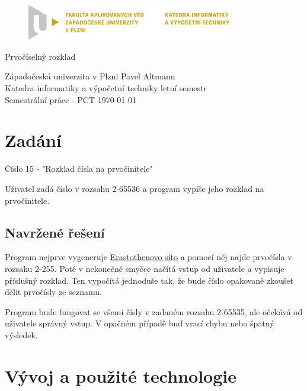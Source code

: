 \documentclass[12pt]{article}
\begin{document}
\begin{figure}[H]
	\centering
	\includegraphics[width=0.8\textwidth]{pic/LOGO_KIV_CMYK.png}
\end{figure}

\begin{center}
	\vspace{.5cm}
	\LARGE{Prvočíselný rozklad}\\
\end{center}

\vfill

\noindent
Západočeská univerzita v Plzni \hfill Pavel Altmann\\
Katedra informatiky a výpočetní techniky \hfill letní semestr\\
Semestrální práce - PCT \hfill \today
\thispagestyle{empty}

\newpage
\setcounter{page}{1}

\tableofcontents

\newpage

\section{Zadání}

Číslo 15 - "Rozklad čísla na prvočinitele"

Uživatel zadá číslo v rozsahu 2-65536 a program vypíše jeho rozklad na
prvočinitele.

\subsection{Navržené řešení}

Program nejprve vygeneruje
\href{https://cs.wikipedia.org/wiki/Eratosthenovo_s%C3%ADto}{Erastothenovo
	síto} a pomocí něj najde prvočísla v rozsahu 2-255. Poté v nekonečné smyčce
načítá vstup od uživatele a vypisuje příslušný rozklad. Ten vypočítá jednoduše
tak, že bude číslo opakovaně zkoušet dělit prvočísly ze seznamu.

Program bude fungovat se všemi čísly v zadaném rozsahu 2-65535, ale očekává od
uživatele správný vstup. V opačném případě buď vrací chybu nebo špatný
výsledek.

\section{Vývoj a použité technologie}
\end{document}
